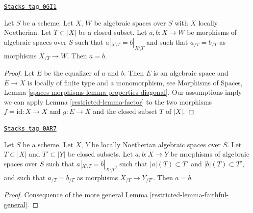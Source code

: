 \begin{lemma}
\label{restricted-lemma-faithful-general}
\href{https://stacks.math.columbia.edu/tag/0GI1}{\texttt{Stacks tag 0GI1}}

Let $S$ be a scheme. Let $X$, $W$ be algebraic spaces over $S$ with
$X$ locally Noetherian. Let $T \subset |X|$ be a closed subset.
Let $a, b : X \to W$ be morphisms of algebraic spaces over $S$ such
that $a|_{X \setminus T} = b|_{X \setminus T}$ and such that
$a_{/T} = b_{/T}$ as morphisms $X_{/T} \to W$. Then $a = b$.
\end{lemma}

\begin{proof}

Let $E$ be the equalizer of $a$ and $b$. Then $E$ is an algebraic space
and $E \to X$ is locally of finite type and a monomorphism, see
Morphisms of Spaces, Lemma \ref{spaces-morphisms-lemma-properties-diagonal}.
Our assumptions imply we can apply Lemma \ref{restricted-lemma-factor} to the two
morphisms $f = \text{id} : X \to X$ and $g : E \to X$ and the closed
subset $T$ of $|X|$.
\end{proof}

\begin{lemma}[Faithful]
\label{restricted-lemma-faithful}
\href{https://stacks.math.columbia.edu/tag/0AR7}{\texttt{Stacks tag 0AR7}}

Let $S$ be a scheme. Let $X$, $Y$ be locally Noetherian algebraic spaces
over $S$. Let $T \subset |X|$ and $T' \subset |Y|$ be closed subsets.
Let $a, b : X \to Y$ be morphisms of algebraic spaces over $S$ such
that $a|_{X \setminus T} = b|_{X \setminus T}$, such that
$|a|(T) \subset T'$ and $|b|(T) \subset T'$, and such that
$a_{/T} = b_{/T}$ as morphisms $X_{/T} \to Y_{/T'}$.
Then $a = b$.
\end{lemma}

\begin{proof}

Consequence of the more general Lemma \ref{restricted-lemma-faithful-general}.
\end{proof}

